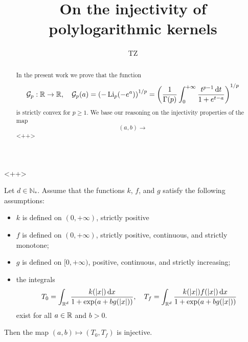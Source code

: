 \documentclass{article}
\author{TZ}
\title{On the injectivity of polylogarithmic kernels}
\begin{document}
\maketitle
\begin{abstract}
	In the present work we prove that the function\[
		\mathcal G_p:{\mathbb R}\to{\mathbb R},\quad \mathcal G_p(a) = \left( -\operatorname{Li}_p(-e^a) \right)^{1/p}=\left( \frac{1}{\Gamma(p)}\int_{0}^{+\infty}\frac{t^{p-1}{\,\mathrm dt}}{1+e^{t-a}} \right)^{1/p}
	\]
	is strictly convex for $p\ge1$. We base our reasoning on the injectivity properties of the map
	\[
		(a,b)\to
	\]<++>
\end{abstract}<++>
\begin{lemma}
	Let $d\in\mathbb N_*$. Assume that the functions $k$, $f$, and $g$ satisfy the following assumptions:
	\begin{itemize}
		\item $k$ is defined on $(0,+\infty)$, strictly positive
		\item $f$ is defined on $(0,+\infty)$, strictly positive, continuous, and strictly monotone;
		\item $g$ is defined on $[0,+\infty)$, positive, continuous, and strictly increasing;
		\item the integrals 
		\[
			T_0 = \int_{{\mathbb R^d}}^{}\frac{k(|x|){\,\mathrm{d} x}}{1+\exp(a+bg(|x|))},\quad T_f = \int_{{\mathbb R^d}}^{}\frac{k(|x|)f(|x|){\,\mathrm{d} x}}{1+\exp(a+bg(|x|))}
		\]
		exist for all $a\in{\mathbb R}$ and $b>0$.
	\end{itemize}
	Then the map $(a,b)\mapsto (T_0,T_f)$ is injective.
	\label{le:basic}
\end{lemma}
\end{document}
